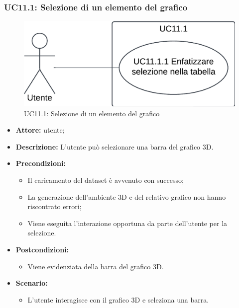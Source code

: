 \pagebreak

\subsubsection{UC11.1: Selezione di un elemento del grafico}
\begin{figure}[h!]\centering
    \includegraphics[scale=0.7]{template/images/UC11.1.png}
    \caption{UC11.1: Selezione di un elemento del grafico}
\end{figure}
\begin{itemize}    
    \item \textbf{Attore:} utente;
    \item \textbf{Descrizione:} L'utente può selezionare una barra del grafico 3D.
    \item \textbf{Precondizioni:}    
        \begin{itemize}
            \item Il caricamento del dataset è avvenuto con successo;
            \item La generazione dell'ambiente 3D e del relativo grafico non hanno riscontrato errori;
            \item Viene eseguita l'interazione opportuna da parte dell'utente per la selezione.
        \end{itemize}    
    \item \textbf{Postcondizioni:}
        \begin{itemize}
            \item Viene evidenziata della barra del grafico 3D.
        \end{itemize}    
    \item \textbf{Scenario:} 
        \begin{itemize}
            \item L'utente interagisce con il grafico 3D e seleziona una barra.
        \end{itemize}
\end{itemize}
